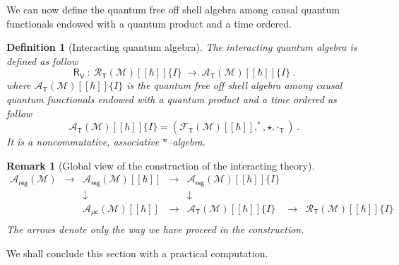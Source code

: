 \documentclass[11pt]{book}
\newcommand{\reg}{\mathsf{reg}}
\newcommand{\muc}{\mu\csf}
\newcommand{\Acal}{\mathcal{A}}
\newcommand{\Fcal}{\mathcal{F}}
\newcommand{\Mcal}{\mathcal{M}}
\newcommand{\Rcal}{\mathcal{R}}
\newcommand{\Rsf}{\mathsf{R}}
\newcommand{\Tsf}{\mathsf{T}}
\newcommand{\Vsf}{\mathsf{V}}
\newcommand{\csf}{\mathsf{c}}
\theoremstyle{break}
\newtheorem{remark}{Remark}[chapter]
\newtheorem{definition}{Definition}[chapter]
\begin{document}
\bigskip


We can now define the quantum free off shell algebra among causal quantum functionals endowed with a quantum product and a time ordered. 


\begin{definition}[Interacting quantum algebra]\label{eq:alg_int}
The interacting quantum algebra is defined as follow
%
\begin{equation}
\Rsf_\Vsf \ : \ \Rcal_\Tsf(\Mcal)[[\hbar]]\{I\} \ \to \ \Acal_\Tsf(\Mcal)[[\hbar]]\{I\} \ .
\label{eq:alg_int}
\end{equation}
\index{$\Rcal_\Tsf(\Mcal)[[\hbar]]\{I\}$}
%
where $\Acal_\Tsf(\Mcal)[[\hbar]]\{I\}$ is the quantum free off shell algebra among causal quantum functionals endowed with a quantum product and a time ordered as follow
%
\begin{equation*}
\Acal_\Tsf(\Mcal)[[\hbar]]\{I\} = \left(\Fcal_\Tsf(\Mcal)[[\hbar]] , ^\ast , \star . \cdot_\Tsf \right) \ . 
\end{equation*}
%
It is a noncommutative, associative $\ast$--algebra.
\end{definition}


\begin{remark}[Global view of the construction of the interacting theory]
\begin{equation*}
\begin{array}{ccccccc}
\Acal_\reg(\Mcal) 
& \to & 
\Acal_\reg(\Mcal)[[\hbar]]
& \to &
\Acal_\reg(\Mcal)[[\hbar]]\{I\} \\
%
%
&&\downarrow&&\downarrow \\
%
%
&& \Acal_{\muc}(\Mcal)[[\hbar]] & \to & \Acal_\Tsf(\Mcal)[[\hbar]]\{I\} & \to & \Rcal_\Tsf(\Mcal)[[\hbar]]\{I\} \\
%
\end{array}
% 
\end{equation*}
%
The arrows denote only the way we have proceed in the construction.
\end{remark}


We shall conclude this section with a practical computation.
\end{document}
